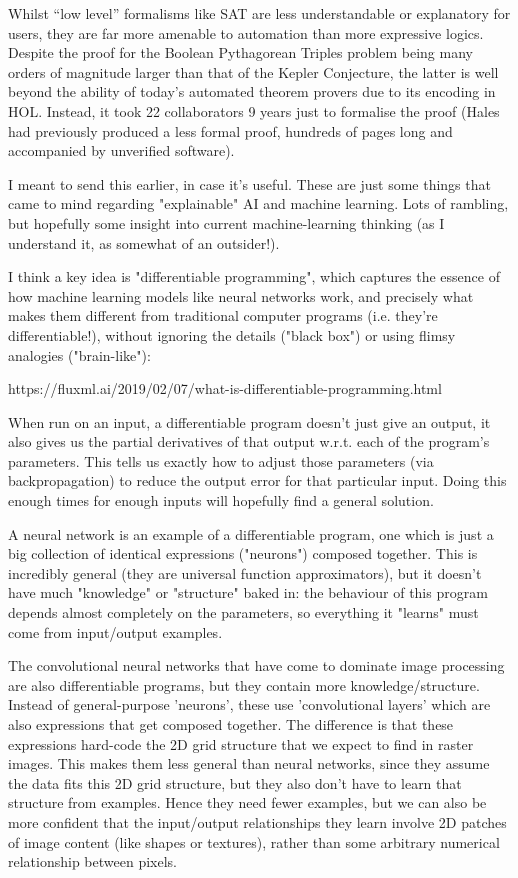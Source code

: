\documentclass{article}
\begin{document}
Whilst ``low level'' formalisms like SAT are less understandable or explanatory
for users, they are far more amenable to automation than more expressive logics.
Despite the proof for the Boolean Pythagorean Triples problem being many orders
of magnitude larger than that of the Kepler Conjecture, the latter is well
beyond the ability of today's automated theorem provers due to its encoding in
HOL. Instead, it took 22 collaborators 9 years just to formalise the proof
(Hales had previously produced a less formal proof, hundreds of pages long and
accompanied by unverified software).




I meant to send this earlier, in case it's useful. These are just some
things that came to mind regarding "explainable" AI and machine
learning. Lots of rambling, but hopefully some insight into current
machine-learning thinking (as I understand it, as somewhat of an
outsider!).

I think a key idea is "differentiable programming", which captures the
essence of how machine learning models like neural networks work, and
precisely what makes them different from traditional computer programs
(i.e. they're differentiable!), without ignoring the details ("black
box") or using flimsy analogies ("brain-like"):

https://fluxml.ai/2019/02/07/what-is-differentiable-programming.html

When run on an input, a differentiable program doesn't just give an
output, it also gives us the partial derivatives of that output
w.r.t. each of the program's parameters. This tells us exactly how to
adjust those parameters (via backpropagation) to reduce the output error
for that particular input. Doing this enough times for enough inputs
will hopefully find a general solution.

A neural network is an example of a differentiable program, one which is
just a big collection of identical expressions ("neurons") composed
together. This is incredibly general (they are universal function
approximators), but it doesn't have much "knowledge" or "structure"
baked in: the behaviour of this program depends almost completely on the
parameters, so everything it "learns" must come from input/output
examples.

The convolutional neural networks that have come to dominate image
processing are also differentiable programs, but they contain more
knowledge/structure. Instead of general-purpose 'neurons', these use
'convolutional layers' which are also expressions that get composed
together. The difference is that these expressions hard-code the 2D grid
structure that we expect to find in raster images. This makes them less
general than neural networks, since they assume the data fits this 2D
grid structure, but they also don't have to learn that structure from
examples. Hence they need fewer examples, but we can also be more
confident that the input/output relationships they learn involve 2D
patches of image content (like shapes or textures), rather than some
arbitrary numerical relationship between pixels.
\end{document}
